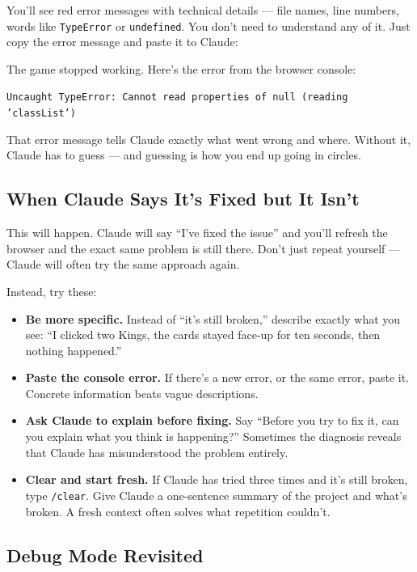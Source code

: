 \documentclass[11pt,a4paper]{article}
\begin{document}
You'll see red error messages with technical details --- file names, line numbers, words like \texttt{TypeError} or \texttt{undefined}. You don't need to understand any of it. Just copy the error message and paste it to Claude:

\begin{tcolorbox}[promptbox]
The game stopped working. Here's the error from the browser console:

\texttt{Uncaught TypeError: Cannot read properties of null (reading 'classList')}
\end{tcolorbox}

That error message tells Claude exactly what went wrong and where. Without it, Claude has to guess --- and guessing is how you end up going in circles.

\subsection{When Claude Says It's Fixed but It Isn't}

This will happen. Claude will say ``I've fixed the issue'' and you'll refresh the browser and the exact same problem is still there. Don't just repeat yourself --- Claude will often try the same approach again.

Instead, try these:

\begin{itemize}[leftmargin=1.5em]
  \item \textbf{Be more specific.} Instead of ``it's still broken,'' describe exactly what you see: ``I clicked two Kings, the cards stayed face-up for ten seconds, then nothing happened.''
  \item \textbf{Paste the console error.} If there's a new error, or the same error, paste it. Concrete information beats vague descriptions.
  \item \textbf{Ask Claude to explain before fixing.} Say ``Before you try to fix it, can you explain what you think is happening?'' Sometimes the diagnosis reveals that Claude has misunderstood the problem entirely.
  \item \textbf{Clear and start fresh.} If Claude has tried three times and it's still broken, type \texttt{/clear}. Give Claude a one-sentence summary of the project and what's broken. A fresh context often solves what repetition couldn't.
\end{itemize}

\subsection{Debug Mode Revisited}
\end{document}
